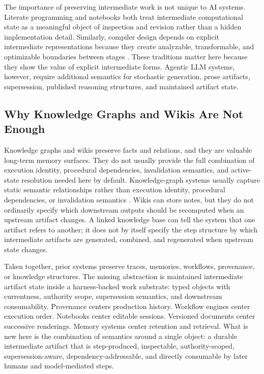 \documentclass{article}
\begin{document}
The importance of preserving intermediate work is not unique to AI systems. Literate programming \cite{knuth1984literate} and notebooks \cite{kluyver2016jupyter} both treat intermediate computational state as a meaningful object of inspection and revision rather than a hidden implementation detail. Similarly, compiler design depends on explicit intermediate representations because they create analyzable, transformable, and optimizable boundaries between stages \cite{lattner2021mlir}. These traditions matter here because they show the value of explicit intermediate forms. Agentic LLM systems, however, require additional semantics for stochastic generation, prose artifacts, supersession, published reasoning structures, and maintained artifact state.

\subsection{Why Knowledge Graphs and Wikis Are Not Enough}

Knowledge graphs and wikis preserve facts and relations, and they are valuable long-term memory surfaces. They do not usually provide the full combination of execution identity, procedural dependencies, invalidation semantics, and active-state resolution needed here by default. Knowledge-graph systems usually capture static semantic relationships rather than execution identity, procedural dependencies, or invalidation semantics \cite{hogan2021knowledgegraphs}. Wikis can store notes, but they do not ordinarily specify which downstream outputs should be recomputed when an upstream artifact changes. A linked knowledge base can tell the system that one artifact refers to another; it does not by itself specify the step structure by which intermediate artifacts are generated, combined, and regenerated when upstream state changes.

Taken together, prior systems preserve traces, memories, workflows, provenance, or knowledge structures. The missing abstraction is maintained intermediate artifact state inside a harness-backed work substrate: typed objects with currentness, authority scope, supersession semantics, and downstream consumability. Provenance centers production history. Workflow engines center execution order. Notebooks center editable sessions. Versioned documents center successive renderings. Memory systems center retention and retrieval. What is new here is the combination of semantics around a single object: a durable intermediate artifact that is step-produced, inspectable, authority-scoped, supersession-aware, dependency-addressable, and directly consumable by later humans and model-mediated steps.
\end{document}
